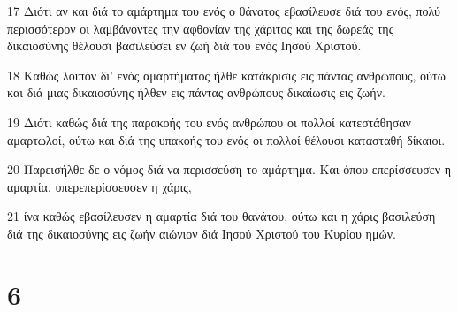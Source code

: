 \par 17 Διότι αν και διά το αμάρτημα του ενός ο θάνατος εβασίλευσε διά του ενός, πολύ περισσότερον οι λαμβάνοντες την αφθονίαν της χάριτος και της δωρεάς της δικαιοσύνης θέλουσι βασιλεύσει εν ζωή διά του ενός Ιησού Χριστού.
\par 18 Καθώς λοιπόν δι' ενός αμαρτήματος ήλθε κατάκρισις εις πάντας ανθρώπους, ούτω και διά μιας δικαιοσύνης ήλθεν εις πάντας ανθρώπους δικαίωσις εις ζωήν.
\par 19 Διότι καθώς διά της παρακοής του ενός ανθρώπου οι πολλοί κατεστάθησαν αμαρτωλοί, ούτω και διά της υπακοής του ενός οι πολλοί θέλουσι κατασταθή δίκαιοι.
\par 20 Παρεισήλθε δε ο νόμος διά να περισσεύση το αμάρτημα. Και όπου επερίσσευσεν η αμαρτία, υπερεπερίσσευσεν η χάρις,
\par 21 ίνα καθώς εβασίλευσεν η αμαρτία διά του θανάτου, ούτω και η χάρις βασιλεύση διά της δικαιοσύνης εις ζωήν αιώνιον διά Ιησού Χριστού του Κυρίου ημών.

\chapter{6}


